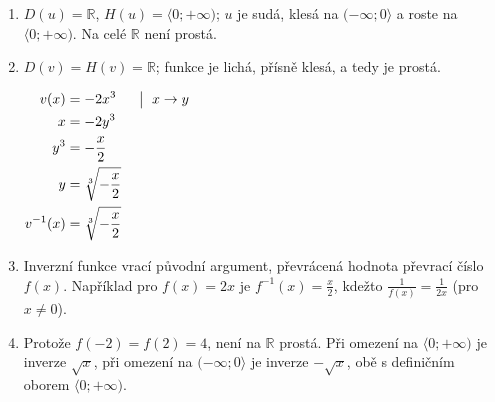 \documentclass[11pt,a4paper]{article}
\begin{document}
\begin{zadaniReseniBox}[title={Domácí úkol}]
\begin{enumerate}[label=\alph*)]
$D(n^{-1})=\langle1;+\infty)$, $H(n^{-1})=(-\infty;2\rangle$. Zápornou větev odmocniny určuje $y\le2$.
\item $D(u)=\mathbb R$, $H(u)=\langle0;+\infty)$; $u$ je sudá, klesá na $(-\infty;0\rangle$ a roste na $\langle0;+\infty)$. Na celé $\mathbb R$ není prostá.
\item $D(v)=H(v)=\mathbb R$; funkce je lichá, přísně klesá, a tedy je prostá.

\(\displaystyle\begin{aligned}v(x)&=-2x^3 &&\bigm|\ x\to y\\x&=-2y^3\\y^3&=-\frac{x}{2}\\y&=\sqrt[3]{-\frac{x}{2}}\\v^{-1}(x)&=\sqrt[3]{-\frac{x}{2}}\end{aligned}\)
\item Inverzní funkce vrací původní argument, převrácená hodnota převrací číslo $f(x)$. Například pro $f(x)=2x$ je $f^{-1}(x)=\frac{x}{2}$, kdežto $\frac{1}{f(x)}=\frac{1}{2x}$ (pro $x\ne0$).
\item Protože $f(-2)=f(2)=4$, není na $\mathbb R$ prostá. Při omezení na $\langle0;+\infty)$ je inverze $\sqrt{x}$, při omezení na $(-\infty;0\rangle$ je inverze $-\sqrt{x}$, obě s definičním oborem $\langle0;+\infty)$.
\end{enumerate}
\end{zadaniReseniBox}
\end{document}
